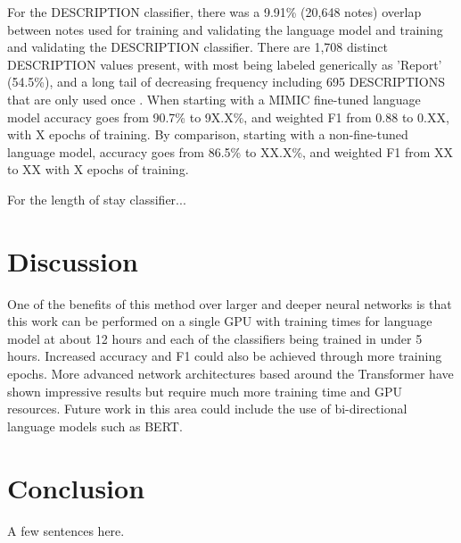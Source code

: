 \documentclass{amia}
\begin{document}
For the DESCRIPTION classifier, there was a 9.91\% (20,648 notes) overlap between notes used for training and validating the language model and training and validating the DESCRIPTION classifier. There are 1,708 distinct DESCRIPTION values present, with most being labeled generically as 'Report' (54.5\%), and a long tail of decreasing frequency including 695 DESCRIPTIONS that are only used once . When starting with a MIMIC fine-tuned language model accuracy goes from 90.7\% to 9X.X\%, and weighted F1 from 0.88 to 0.XX, with X epochs of training. By comparison, starting with a non-fine-tuned language model, accuracy goes from 86.5\% to XX.X\%, and weighted F1 from XX to XX with X epochs of training.

For the length of stay classifier... 

\section*{Discussion}

One of the benefits of this method over larger and deeper neural networks is that this work can be performed on a single GPU with training times for language model at about 12 hours and each of the classifiers being trained in under 5 hours. Increased accuracy and F1 could also be achieved through more training epochs. More advanced network architectures based around the Transformer\cite{vaswani_attention_2017} have shown impressive results but require much more training time and GPU resources. Future work in this area could include the use of bi-directional language models such as BERT\cite{Devlin2018Oct}.

\section*{Conclusion}

A few sentences here.



\end{document}
